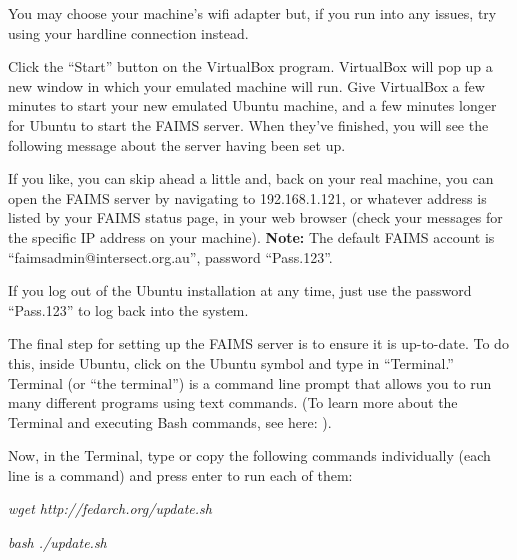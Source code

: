 {}

You may choose your machine's wifi adapter but, if you run into any issues, try using your hardline connection instead.

Click the “Start” button on the VirtualBox program. VirtualBox will pop up a new window in which your emulated machine will run. Give VirtualBox a few minutes to start your new emulated Ubuntu machine, and a few minutes longer for Ubuntu to start the FAIMS server. When they've finished, you will see the following message about the server having been set up.

{}

If you like, you can skip ahead a little and, back on your real machine, you can open the FAIMS server by navigating to 192.168.1.121, or whatever address is listed by your FAIMS status page, in your web browser (check your messages for the specific IP address on your machine). {\bf Note:} The default FAIMS account is “faimsadmin@intersect.org.au”, password “Pass.123”.{}

If you log out of the Ubuntu installation at any time, just use the password “Pass.123” to log back into the system.


The final step for setting up the FAIMS server is to ensure it is up-to-date. To do this, inside Ubuntu, click on the Ubuntu symbol and type in “Terminal.” Terminal (or “the terminal”) is a command line prompt that allows you to run many different programs using text commands. (To learn more about the Terminal and executing Bash commands, see here: \from[url8]).

{}

Now, in the Terminal, type or copy the following commands individually (each line is a command) and press enter to run each of them:

{\em wget http://fedarch.org/update.sh}

{\em bash ./update.sh}

\subsubsection[section-2]{}

